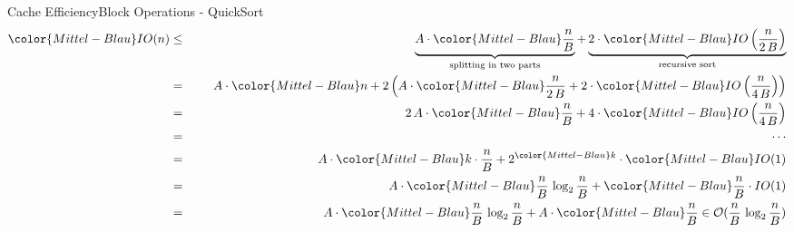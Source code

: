 
\begin{frame}{Cache Efficiency}{Block Operations - QuickSort}
  \begin{eqnarray*}
    {\color{Mittel-Blau}IO(n)} &\leq\hspace{1.5em}&
      \underbrace{
        A \cdot {\color{Mittel-Blau}\frac{n}{B}}
      }_{\text{splitting in two parts}}
      +
      \underbrace{
        2 \cdot {\color{Mittel-Blau}IO\left(\frac{n}{2\,B}\right)}
      }_{\text{recursive sort}}\\
    {} &=&
      A \cdot {\color{Mittel-Blau}n} + 2 \left(
        A \cdot {\color{Mittel-Blau}\frac{n}{2\,B}}
        + 2 \cdot {\color{Mittel-Blau}IO\left(\frac{n}{4\,B}\right)}
      \right)\\
    {} &=&
      2\,A \cdot {\color{Mittel-Blau}\frac{n}{B}}
      + 4 \cdot {\color{Mittel-Blau}IO\left(\frac{n}{4\,B}\right)}\\
    {} &=&\hspace{1.5em}\cdots\\
    {} &=&
      A \cdot {\color{Mittel-Blau}k \cdot \frac{n}{B}}
      + 2^{\color{Mittel-Blau}k}
      \cdot {\color{Mittel-Blau}IO(1)}\\
    {} &=&
      A \cdot {\color{Mittel-Blau}\frac{n}{B} \, \log_2 \frac{n}{B}}
      + {\color{Mittel-Blau}\frac{n}{B} \cdot IO(1)}\\
    {} &=&
      A \cdot {\color{Mittel-Blau}\frac{n}{B} \, \log_2 \frac{n}{B}}
      + A \cdot {\color{Mittel-Blau}\frac{n}{B}}
      \in \mathcal{O}(\frac{n}{B} \, \log_2 \frac{n}{B})
  \end{eqnarray*}
\end{frame}
